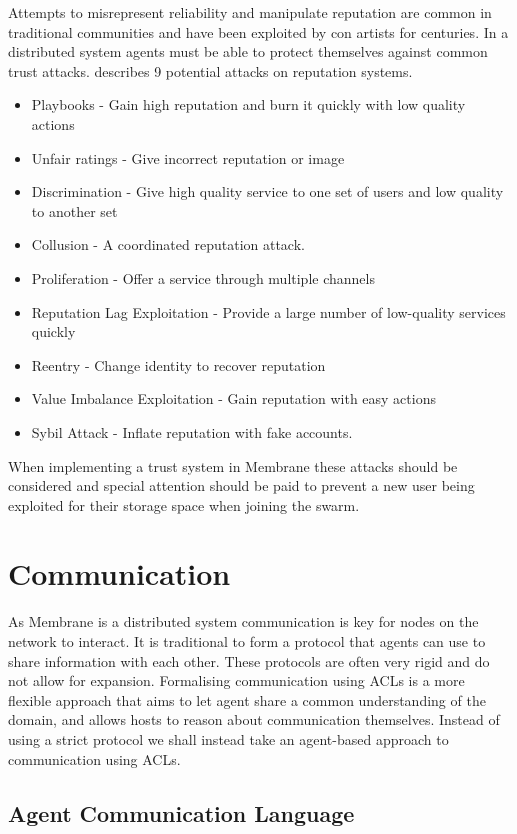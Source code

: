 \documentclass[11pt, a4paper, twocolumn, twoside]{report}
\begin{document}
Attempts to misrepresent reliability and manipulate reputation are common in traditional communities and have been exploited by con artists for centuries. In a distributed system agents must be able to protect themselves against common trust attacks. \cite{josang2009challenges} describes 9 potential attacks on reputation systems.
\begin{itemize}
 \item Playbooks - Gain high reputation and burn it quickly with low quality actions
 \item Unfair ratings - Give incorrect reputation or image
 \item Discrimination - Give high quality service to one set of users and low quality to another set
 \item Collusion - A coordinated reputation attack.
 \item Proliferation - Offer a service through multiple channels
 \item Reputation Lag Exploitation - Provide a large number of low-quality services quickly
 \item Reentry - Change identity to recover reputation
 \item Value Imbalance Exploitation - Gain reputation with easy actions
 \item Sybil Attack - Inflate reputation with fake accounts.
\end{itemize}
When implementing a trust system in Membrane these attacks should be considered and special attention should be paid to prevent a new user being exploited for their storage space when joining the swarm.

\section{Communication}

As Membrane is a distributed system communication is key for nodes on the network to interact. It is traditional to form a protocol that agents can use to share information with each other. These protocols are often very rigid and do not allow for expansion. Formalising communication using ACLs is a more flexible approach that aims to let agent share a common understanding of the domain, and allows hosts to reason about communication themselves. Instead of using a strict protocol we shall instead take an agent-based approach to communication using ACLs.

\subsection{Agent Communication Language}
\end{document}
